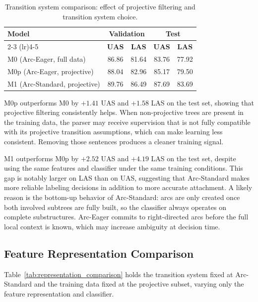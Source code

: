 \documentclass[12pt,letterpaper]{article}
\begin{document}
\begin{table}[ht]
\centering
\caption{Transition system comparison: effect of projective filtering and transition system choice.}
\label{tab:transition_comparison}
\small
\begin{tabular}{lcccc}
\toprule
\textbf{Model} & \multicolumn{2}{c}{\textbf{Validation}} & \multicolumn{2}{c}{\textbf{Test}} \\
\cmidrule(lr){2-3} \cmidrule(lr){4-5}
& \textbf{UAS} & \textbf{LAS} & \textbf{UAS} & \textbf{LAS} \\
\midrule
M0  (Arc-Eager, full data)        & 86.86 & 81.64 & 83.76 & 77.92 \\
M0p (Arc-Eager, projective)       & 88.04 & 82.96 & 85.17 & 79.50 \\
M1  (Arc-Standard, projective)    & 89.76 & 86.49 & 87.69 & 83.69 \\
\bottomrule
\end{tabular}
\end{table}
\FloatBarrier
M0p outperforms M0 by $+1.41$ UAS and $+1.58$ LAS on the test set, showing that projective filtering consistently helps. When non-projective trees are present in the training data, the parser may receive supervision that is not fully compatible with its projective transition assumptions, which can make learning less consistent. Removing those sentences produces a cleaner training signal.

M1 outperforms M0p by $+2.52$ UAS and $+4.19$ LAS on the test set, despite using the same features and classifier under the same training conditions. This gap is notably larger on LAS than on UAS, suggesting that Arc-Standard makes more reliable labeling decisions in addition to more accurate attachment. A likely reason is the bottom-up behavior of Arc-Standard: arcs are only created once both involved subtrees are fully built, so the classifier always operates on complete substructures. Arc-Eager commits to right-directed arcs before the full local context is known, which may increase ambiguity at decision time.

\subsection{Feature Representation Comparison}
\label{subsec:representation_comparison}

Table~\ref{tab:representation_comparison} holds the transition system fixed at Arc-Standard and the training data fixed at the projective subset, varying only the feature representation and classifier.
\end{document}
